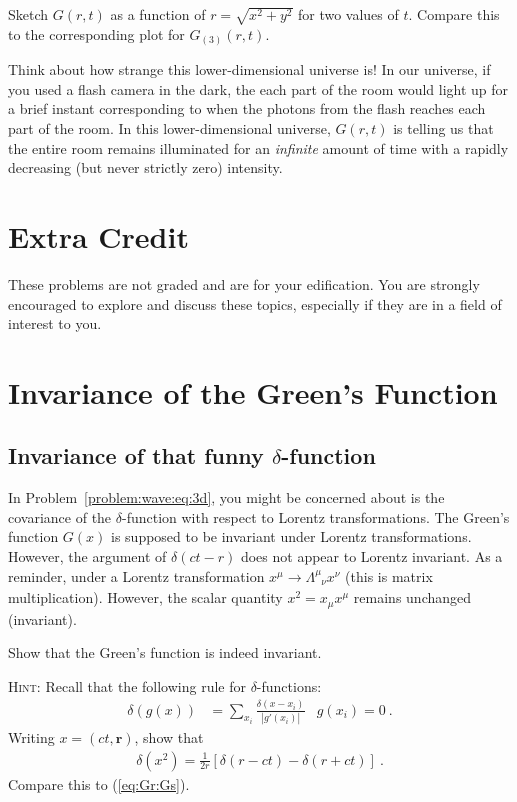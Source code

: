 \documentclass[12pt]{article}
\numberwithin{equation}{section}    %
\renewcommand{\vec}[1]{\mathbf{#1}} %
\begin{document}
Sketch $G(r,t)$ as a function of $r = \sqrt{x^2 + y^2}$ for two values of $t$. Compare this to the corresponding plot for $G_{(3)}(r,t)$. 

Think about how strange this lower-dimensional universe is! In our universe, if you used a flash camera in the dark, the each part of the room would light up for a brief instant corresponding to when the photons from the flash reaches each part of the room. In this lower-dimensional universe, $G(r,t)$ is telling us that the entire room remains illuminated for an \emph{infinite} amount of time with a rapidly decreasing (but never strictly zero) intensity.











\appendix
\section*{\Large Extra Credit}


These problems are not graded and are for your edification. You are strongly encouraged to explore and discuss these topics, especially if they are in a field of interest to you.

\section{Invariance of the Green's Function}

\subsection{Invariance of that funny $\delta$-function}

In Problem~\ref{problem:wave:eq:3d}, you might be concerned about is the covariance of the $\delta$-function with respect to Lorentz transformations. The Green's function $G(x)$ is supposed to be invariant under Lorentz transformations. However, the argument of $\delta(ct - r)$ does not appear to Lorentz invariant. As a reminder, under a Lorentz transformation $x^\mu \to \Lambda^\mu_{\phantom\mu\nu}x^\nu$ (this is matrix multiplication). However, the scalar quantity $x^2 = x_\mu x^\mu$ remains unchanged (invariant).

Show that the Green's function is indeed invariant.


\textsc{Hint:} Recall that the following rule for $\delta$-functions:
\begin{align}
	\delta\left(g(x)\right) &= \sum_{x_i} \frac{\delta(x-x_i)}{|g'(x_i)|}
	&
	g(x_i) = 0 \ .
\end{align}
Writing $x = (ct,\vec r)$, show that
\begin{align}
	\delta(x^2) = \frac{1}{2r} \left[
	\delta(r-ct) - \delta(r+ct)
	\right] \ .
\end{align}
Compare this to (\ref{eq:Gr:Gs}). 
\end{document}
